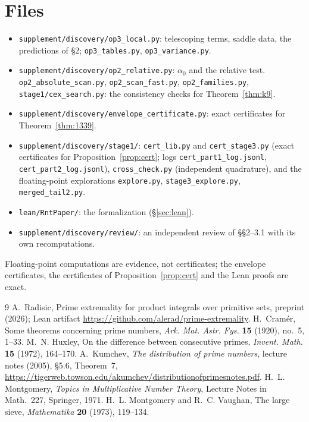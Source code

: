 \documentclass[11pt]{article}
\theoremstyle{remark}
\begin{document}
\section*{Files}
\begin{itemize}
\item \texttt{supplement/discovery/op3\_local.py}: telescoping terms, saddle data, the
predictions of \S2; \texttt{op3\_tables.py}, \texttt{op3\_variance.py}.
\item \texttt{supplement/discovery/op2\_relative.py}: $\alpha_0$ and the relative test.
\texttt{op2\_absolute\_scan.py}, \texttt{op2\_scan\_fast.py}, \texttt{op2\_families.py},
\texttt{stage1/cex\_search.py}: the consistency checks for Theorem~\ref{thm:k9}.
\item \texttt{supplement/discovery/envelope\_certificate.py}: exact certificates for
Theorem~\ref{thm:1339}.
\item \texttt{supplement/discovery/stage1/}: \texttt{cert\_lib.py} and \texttt{cert\_stage3.py}
(exact certificates for Proposition~\ref{prop:cert}; logs \texttt{cert\_part1\_log.jsonl},
\texttt{cert\_part2\_log.jsonl}), \texttt{cross\_check.py} (independent quadrature), and the
floating-point explorations \texttt{explore.py}, \texttt{stage3\_explore.py},
\texttt{merged\_tail2.py}.
\item \texttt{lean/RntPaper/}: the formalization (\S\ref{sec:lean}).
\item \texttt{supplement/discovery/review/}: an independent review of \S\S2--3.1 with its own
recomputations.
\end{itemize}
Floating-point computations are evidence, not certificates; the envelope certificates, the
certificates of Proposition~\ref{prop:cert} and the Lean proofs are exact.

\begin{thebibliography}{9}
 A.~Radisic, Prime extremality for product integrals over primitive sets,
preprint (2026); Lean artifact \url{https://github.com/alerad/prime-extremality}.
 H.~Cram\'er, Some theorems concerning prime numbers, \emph{Ark. Mat. Astr.
Fys.} \textbf{15} (1920), no.~5, 1--33.
 M.~N. Huxley, On the difference between consecutive primes, \emph{Invent.
Math.} \textbf{15} (1972), 164--170.
 A.~Kumchev, \emph{The distribution of prime numbers}, lecture notes (2005),
\S5.6, Theorem~7, \url{https://tigerweb.towson.edu/akumchev/distributionofprimesnotes.pdf}.
 H.~L. Montgomery, \emph{Topics in Multiplicative Number Theory}, Lecture Notes
in Math.~227, Springer, 1971.
 H.~L. Montgomery and R.~C. Vaughan, The large sieve, \emph{Mathematika}
\textbf{20} (1973), 119--134.
\end{thebibliography}
\end{document}
